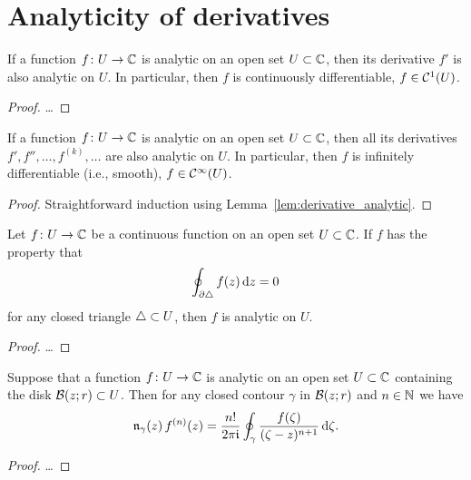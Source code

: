 \section{Analyticity of derivatives}

\begin{lemma}
  \label{lem:derivative_analytic}
  If a function $f \colon U \to \bC$ is analytic on an open set $U \subset \bC$,
  then its derivative $f'$ is also analytic on $U$.
  In particular, then $f$ is continuously differentiable,
  $f \in \ContDiff{1}(U)$.
\end{lemma}
\begin{proof}
  \ldots
\end{proof}

\begin{corollary}
  \label{lem:higher_derivatives_analytic}
  If a function $f \colon U \to \bC$ is analytic on an open set $U \subset \bC$,
  then all its derivatives $f', f'', \ldots, f^{(k)}, \ldots$ are also analytic on $U$.
  In particular, then $f$ is infinitely differentiable (i.e., smooth),
  $f \in \Smooth(U)$.
\end{corollary}
\begin{proof}
  Straightforward induction using Lemma~\ref{lem:derivative_analytic}.
\end{proof}

\begin{theorem}
  \label{thm:morera}
  Let $f \colon U \to \bC$ be a continuous function on an open set $U \subset \bC$.
  If $f$ has the property that
  \begin{align*}
    \oint_{\bdry \Tri} f(z) \, \ud z = 0
  \end{align*}
  for any closed triangle $\Tri \subset U$, then $f$ is analytic on $U$.
\end{theorem}
\begin{proof}
  \ldots
\end{proof}

\begin{theorem}
  \label{thm:cauchy_formula_derivative}
  Suppose that a function $f \colon U \to \bC$ is analytic on an open
  set $U \subset \bC$ containing the disk $\DiskRC{r}{z} \subset U$.
  Then for any closed contour $\gamma$ in $\DiskRC{r}{z}$
  and $n \in \bN$ we have
  \begin{align*}
    \windN{\gamma}{z} \, f^{(n)}(z)
      = \frac{n!}{2\pi \ii} \oint_\gamma \frac{f(\zeta)}{(\zeta - z)^{n+1}} \, \ud \zeta .
  \end{align*}
\end{theorem}
\begin{proof}
  \ldots
\end{proof}

